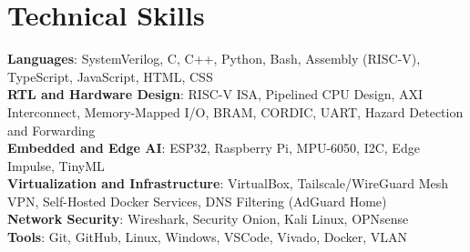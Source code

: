 \section{Technical Skills}
 \begin{itemize}[leftmargin=0.15in, label={}]
    \small{\item{
     \textbf{Languages}{: SystemVerilog, C, C++, Python, Bash, Assembly (RISC-V), TypeScript, JavaScript, HTML, CSS} \\
     \textbf{RTL and Hardware Design}{: RISC-V ISA, Pipelined CPU Design, AXI Interconnect, Memory-Mapped I/O, BRAM, CORDIC, UART, Hazard Detection and Forwarding} \\
     \textbf{Embedded and Edge AI}{: ESP32, Raspberry Pi, MPU-6050, I2C, Edge Impulse, TinyML} \\
     \textbf{Virtualization and Infrastructure}{: VirtualBox, Tailscale/WireGuard Mesh VPN, Self-Hosted Docker Services, DNS Filtering (AdGuard Home)} \\
     \textbf{Network Security}{: Wireshark, Security Onion, Kali Linux, OPNsense} \\
     \textbf{Tools}{: Git, GitHub, Linux, Windows, VSCode, Vivado, Docker, VLAN} \\
    }}
 \end{itemize}
